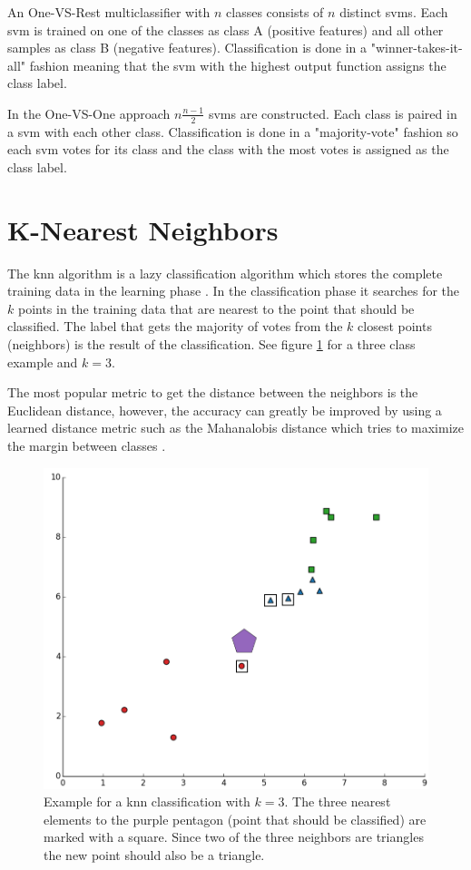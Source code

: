 An One-VS-Rest multiclassifier with $n$ classes consists of $n$ distinct \glspl{svm}. Each \gls{svm} is trained on one of the classes as class A {(positive features)} and all other samples as class B {(negative features)}. Classification is done in a "winner-takes-it-all" fashion meaning that the \gls{svm} with the highest output function assigns the class label.

In the One-VS-One approach $n\frac{n-1}{2}$ \glspl{svm} are constructed. Each class is paired in a \gls{svm} with each other class. Classification is done in a "majority-vote" fashion so each \gls{svm} votes for its class and the class with the most votes is assigned as the class label.
\newpage
\section{K-Nearest Neighbors}
The \gls{knn} algorithm is a lazy classification algorithm which stores the complete training data in the learning phase \cite{Keller1985}. In the classification phase it searches for the $k$ points in the training data that are nearest to the point that should be classified. The label that gets the majority of votes from the $k$ closest points {(neighbors)} is the result of the classification. See figure \ref{fig:knn3} for a three class example and $k=3$. 

The most popular metric to get the distance between the neighbors is the Euclidean distance, however, the accuracy can greatly be improved by using a learned distance metric such as the Mahanalobis distance which tries to maximize the margin between classes \cite{Weinberger2005}. 

\begin{figure}[ht]
	\centering
	\includegraphics[scale=0.45]{figures/theoryKNN_3}
	\caption{Example for a knn classification with $k=3$. The three nearest elements to the purple pentagon {(point that should be classified)} are marked with a square. Since two of the three neighbors are triangles the new point should also be a triangle.}
	\label{fig:knn3}
\end{figure}

